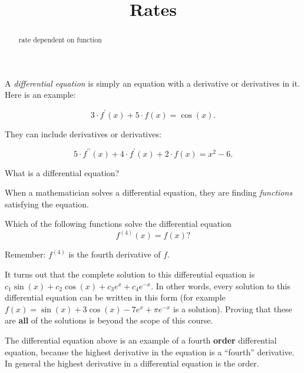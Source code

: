 \documentclass{ximera}
\title{Rates}
\begin{document}
\begin{abstract}
  rate dependent on function
\end{abstract}
\maketitle

A \textit{differential equation} is
simply an equation with a derivative or derivatives in it. Here is an example:



\[
 3 \cdot f^{\prime}(x) + 5 \cdot f(x) = \cos(x). 
\]


They can include derivatives or derivatives:

\[
5 \cdot f^{\prime\prime}(x) + 4 \cdot f^{\prime}(x) + 2 \cdot f(x) = x^2 - 6. 
\]
\begin{question}
  What is a differential equation?
  \begin{multipleChoice}
  \end{multipleChoice}
\end{question}








When a mathematician solves a differential equation, they are finding
\textit{functions} satisfying the equation.
\begin{example}
  Which of the following functions solve the differential equation
  \[
  f^{(4)}(x) = f(x)?
  \]

    Remember: $f^{(4)}$ is the fourth derivative of $f$.

    It turns out that the complete solution to this differential equation
    is $c_1\sin(x)+c_2\cos(x)+c_3e^x+c_4e^{-x}$.  In other words, every
    solution to this differential equation can be written in this form
    (for example $f(x) =
    \sin(x)+3\cos(x)-7e^x+\pi e^{-x}$ is a solution).  Proving that these
    are \textbf{all} of the solutions is beyond the scope of this course.

\end{example}


The differential equation above is an example of a fourth \textbf{order}
differential equation, because the highest derivative in the equation
is a ``fourth'' derivative. In general the highest derivative in a
differential equation is the order.
\end{document}

